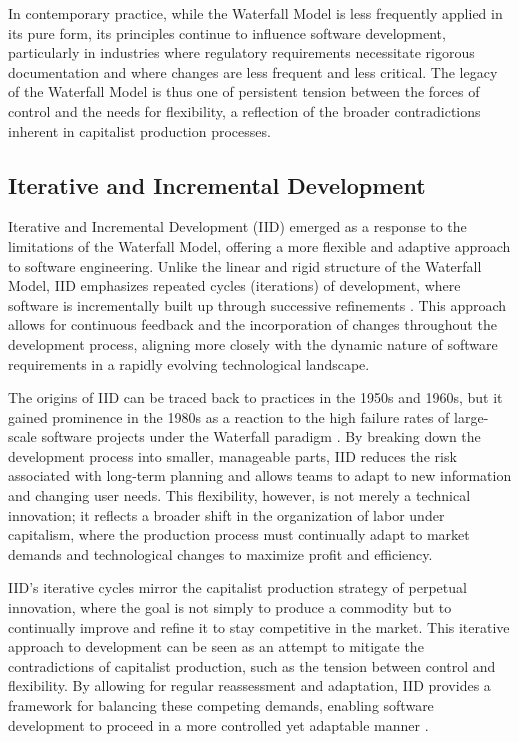 \begin{refsection}
In contemporary practice, while the Waterfall Model is less frequently applied in its pure form, its principles continue to influence software development, particularly in industries where regulatory requirements necessitate rigorous documentation and where changes are less frequent and less critical. The legacy of the Waterfall Model is thus one of persistent tension between the forces of control and the needs for flexibility, a reflection of the broader contradictions inherent in capitalist production processes.

\subsection{Iterative and Incremental Development}

Iterative and Incremental Development (IID) emerged as a response to the limitations of the Waterfall Model, offering a more flexible and adaptive approach to software engineering. Unlike the linear and rigid structure of the Waterfall Model, IID emphasizes repeated cycles (iterations) of development, where software is incrementally built up through successive refinements \cite[pp.~33-36]{Larman2003}. This approach allows for continuous feedback and the incorporation of changes throughout the development process, aligning more closely with the dynamic nature of software requirements in a rapidly evolving technological landscape.

The origins of IID can be traced back to practices in the 1950s and 1960s, but it gained prominence in the 1980s as a reaction to the high failure rates of large-scale software projects under the Waterfall paradigm \cite[pp.~19-22]{Boehm1988}. By breaking down the development process into smaller, manageable parts, IID reduces the risk associated with long-term planning and allows teams to adapt to new information and changing user needs. This flexibility, however, is not merely a technical innovation; it reflects a broader shift in the organization of labor under capitalism, where the production process must continually adapt to market demands and technological changes to maximize profit and efficiency.

IID's iterative cycles mirror the capitalist production strategy of perpetual innovation, where the goal is not simply to produce a commodity but to continually improve and refine it to stay competitive in the market. This iterative approach to development can be seen as an attempt to mitigate the contradictions of capitalist production, such as the tension between control and flexibility. By allowing for regular reassessment and adaptation, IID provides a framework for balancing these competing demands, enabling software development to proceed in a more controlled yet adaptable manner \cite[pp.~72-75]{Sommerville2011}.


\end{refsection}
